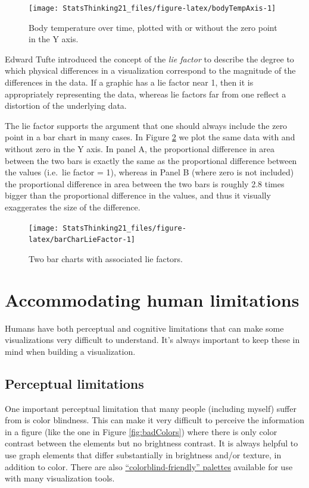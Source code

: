 \documentclass[12pt,]{book}
\theoremstyle{definition}
\theoremstyle{definition}
\theoremstyle{definition}
\theoremstyle{remark}
\begin{document}
\begin{figure}
\texttt{[image: StatsThinking21\_files/figure-latex/bodyTempAxis-1]} \caption{Body temperature over time, plotted with or without the zero point in the Y axis.}\label{fig:bodyTempAxis}
\end{figure}

Edward Tufte introduced the concept of the \emph{lie factor} to describe the degree to which physical differences in a visualization correspond to the magnitude of the differences in the data. If a graphic has a lie factor near 1, then it is appropriately representing the data, whereas lie factors far from one reflect a distortion of the underlying data.

The lie factor supports the argument that one should always include the zero point in a bar chart in many cases. In Figure \ref{fig:barCharLieFactor} we plot the same data with and without zero in the Y axis. In panel A, the proportional difference in area between the two bars is exactly the same as the proportional difference between the values (i.e.~lie factor = 1), whereas in Panel B (where zero is not included) the proportional difference in area between the two bars is roughly 2.8 times bigger than the proportional difference in the values, and thus it visually exaggerates the size of the difference.

\begin{figure}
\texttt{[image: StatsThinking21\_files/figure-latex/barCharLieFactor-1]} \caption{Two bar charts with associated lie factors.}\label{fig:barCharLieFactor}
\end{figure}

\hypertarget{accommodating-human-limitations}{%
\section{Accommodating human limitations}\label{accommodating-human-limitations}}

Humans have both perceptual and cognitive limitations that can make some visualizations very difficult to understand. It's always important to keep these in mind when building a visualization.

\hypertarget{perceptual-limitations}{%
\subsection{Perceptual limitations}\label{perceptual-limitations}}

One important perceptual limitation that many people (including myself) suffer from is color blindness. This can make it very difficult to perceive the information in a figure (like the one in Figure \ref{fig:badColors}) where there is only color contrast between the elements but no brightness contrast. It is always helpful to use graph elements that differ substantially in brightness and/or texture, in addition to color. There are also \href{http://www.cookbook-r.com/Graphs/Colors_(ggplot2)/\#a-colorblind-friendly-palette}{``colorblind-friendly'' palettes} available for use with many visualization tools.
\end{document}
